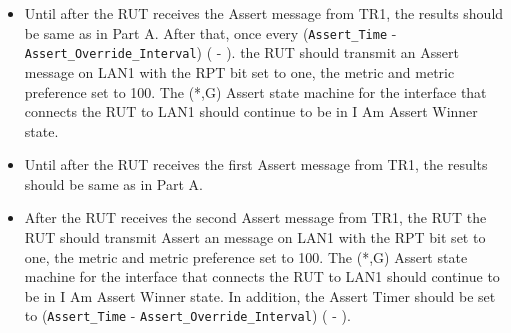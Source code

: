 \documentclass[11pt]{report}
\begin{document}

\begin{itemize}

  \item Until after the RUT receives the Assert message from TR1, the results
  should be same as in Part A. After that, once every \newline
  (\verb=Assert_Time= - \verb=Assert_Override_Interval=)
  ({\PimsmAssertTime} - {\PimsmAssertOverrideInterval}).
  the RUT should transmit an Assert message on LAN1 with the RPT bit set to
  one, the metric and metric preference set to 100. The (*,G) Assert state
  machine for the interface that connects the RUT to LAN1 should continue to
  be in I Am Assert Winner state.

\end{itemize}


\begin{itemize}

  \item Until after the RUT receives the first Assert message from TR1, the
  results should be same as in Part A.

  \item After the RUT receives the second Assert message from TR1, the RUT
  the RUT should transmit Assert an message on LAN1 with the RPT bit set to
  one, the metric and metric preference set to 100. The (*,G) Assert state
  machine for the interface that connects the RUT to LAN1 should continue to
  be in I Am Assert Winner state. In addition, the Assert Timer should be set
  to \newline
  (\verb=Assert_Time= - \verb=Assert_Override_Interval=)
  ({\PimsmAssertTime} - {\PimsmAssertOverrideInterval}).

\end{itemize}

\end{document}
